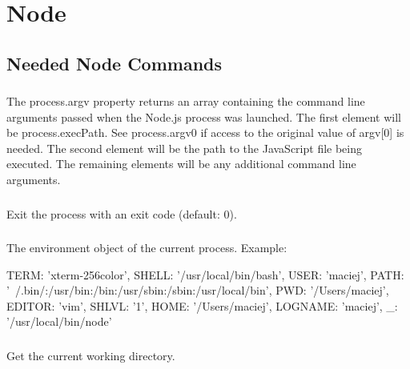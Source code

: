 \section{Node}


\subsection{Needed Node Commands}

\subsubsection{}

The process.argv property returns an array containing the command line
arguments passed when the Node.js process was launched. The first element will
be process.execPath. See process.argv0 if access to the original value of
argv[0] is needed. The second element will be the path to the JavaScript file
being executed. The remaining elements will be any additional command line
arguments.



\subsubsection{}

Exit the process with an exit code (default: 0).

\subsubsection{}

The environment object of the current process. Example:
\begin{js}
  {
    TERM: 'xterm-256color',
    SHELL: '/usr/local/bin/bash',
    USER: 'maciej',
    PATH: '~/.bin/:/usr/bin:/bin:/usr/sbin:/sbin:/usr/local/bin',
    PWD: '/Users/maciej',
    EDITOR: 'vim',
    SHLVL: '1',
    HOME: '/Users/maciej',
    LOGNAME: 'maciej',
    _: '/usr/local/bin/node'
  }
\end{js}

\subsubsection{}

Get the current working directory.

\subsubsection{}

